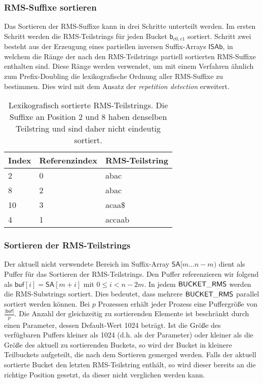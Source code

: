 \subsubsection{RMS-Suffixe sortieren}
Das Sortieren der RMS-Suffixe kann in drei Schritte unterteilt werden. Im ersten Schritt werden die RMS-Teilstrings für jeden Bucket $\mathsf{b}_{c0,c1}$ sortiert. Schritt zwei besteht aus der Erzeugung eines partiellen inversen Suffix-Arrays $\mathsf{ISAb}$, in welchem die Ränge der nach den RMS-Teilstrings partiell sortierten RMS-Suffixe enthalten sind. Diese Ränge werden verwendet, um mit einem Verfahren ähnlich zum Prefix-Doubling die lexikografische Ordnung aller RMS-Suffixe zu bestimmen. Dies wird mit dem Ansatz der \textit{repetition detection} erweitert.

\begin{table}
	\begin{tabular}{l|l|l}
		Index & Referenzindex & RMS-Teilstring \\ \hline
		2     & 0             & abac           \\ \hline
		8     & 2             & abac           \\ \hline
		10    & 3             & acaa\$         \\ \hline
		4     & 1             & accaab         \\ \hline
	\end{tabular}
	\caption{Lexikografisch sortierte RMS-Teilstrings. Die Suffixe an Position 2 und 8 haben denselben Teilstring und sind daher nicht eindeutig sortiert.}
	\label{dss:table:substrings}
\end{table}

\subsubsection{Sortieren der RMS-Teilstrings}
Der aktuell nicht verwendete Bereich im Suffix-Array $\mathsf{SA}[m\dots n-m)$ dient als Puffer für das Sortieren der RMS-Teilstrings. Den Puffer referenzieren wir folgend als $\mathsf{buf}[i] = \mathsf{SA}[m+i]$ mit $0 \leq i < n - 2m$. In jedem $\mathsf{BUCK\-ET\_RMS}$ werden die RMS-Substrings sortiert. Dies bedeutet, dass mehrere $\mathsf{BUCK\-ET\_RMS}$ parallel sortiert werden können. Bei $p$ Prozessen erhält jeder Prozess eine Puffergröße von $\frac{|\mathsf{buf}|}{p}$. Die Anzahl der gleichzeitig zu sortierenden Elemente ist beschränkt durch einen Parameter, dessen Default-Wert 1024 beträgt. Ist die Größe des verfügbaren Puffers kleiner als 1024 (d.h. als der Parameter) oder kleiner als die Größe des aktuell zu sortierenden Buckets, so wird der Bucket in kleinere Teilbuckets aufgeteilt, die nach dem Sortieren gemerged werden. Falls der aktuell sortierte Bucket den letzten RMS-Teilstring enthält, so wird dieser bereits an die richtige Position gesetzt, da dieser nicht verglichen werden kann. 



